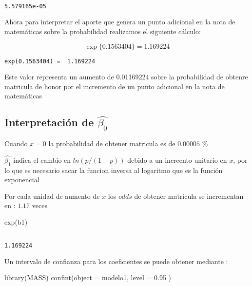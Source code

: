 \documentclass[
]{article}
\newenvironment{Shaded}{\begin{snugshade}}{\end{snugshade}}
\newcommand{\AttributeTok}[1]{\textcolor[rgb]{0.77,0.63,0.00}{#1}}
\newcommand{\FloatTok}[1]{\textcolor[rgb]{0.00,0.00,0.81}{#1}}
\newcommand{\FunctionTok}[1]{\textcolor[rgb]{0.00,0.00,0.00}{#1}}
\newcommand{\NormalTok}[1]{#1}
\begin{document}
\begin{verbatim}
             
5.579165e-05 
\end{verbatim}

Ahora para interpretar el aporte que genera un punto adicional en la
nota de matemáticas sobre la probabilidad realizamos el siguiente
cálculo:

\[\exp{\{ 0.1563404 \}} = 1.169224\]

\begin{verbatim}
exp(0.1563404) =  1.169224
\end{verbatim}

Este valor representa un aumento de 0.01169224 sobre la probabilidad de
obtenre matricula de honor por el incremento de un punto adicional en la
nota de matemáticas

\hypertarget{interpretaciuxf3n-de-widehatbeta_0}{%
\subsection{\texorpdfstring{Interpretación de
\(\widehat{\beta_{0}}\)}{Interpretación de \textbackslash widehat\{\textbackslash beta\_\{0\}\}}}\label{interpretaciuxf3n-de-widehatbeta_0}}

Cuando \(x=0\) la probabilidad de obtener matricula es de \(0.00005\) \%

\(\widehat{\beta_{1}}\) indica el cambio en \(ln(p/(1-p))\) debido a un
increento unitario en \(x\), por lo que es necesario sacar la funcion
inversa al logaritmo que es la función exponencial

Por cada unidad de aumento de \(x\) los \(odds\) de obtener matricula se
incrementan en : \(1.17\) veces

\begin{Shaded}
\begin{Highlighting}[]
\FunctionTok{exp}\NormalTok{(b1)}
\end{Highlighting}
\end{Shaded}

\begin{verbatim}
         
1.169224 
\end{verbatim}

Un intervalo de confianza para los coeficientes se puede obtener
mediante :

\begin{Shaded}
\begin{Highlighting}[]
\FunctionTok{library}\NormalTok{(MASS)}
\FunctionTok{confint}\NormalTok{(}\AttributeTok{object =}\NormalTok{ modelo1, }\AttributeTok{level =} \FloatTok{0.95}\NormalTok{ )}
\end{Highlighting}
\end{Shaded}
\end{document}
